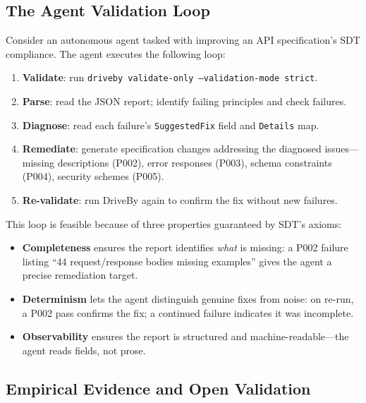 \subsection{The Agent Validation Loop}
\label{subsec:agent-loop}

Consider an autonomous agent tasked with improving an API specification's SDT compliance. The agent executes the following loop:

\begin{enumerate}
    \item \textbf{Validate}: run \texttt{driveby validate-only --validation-mode strict}.
    \item \textbf{Parse}: read the JSON report; identify failing principles and check failures.
    \item \textbf{Diagnose}: read each failure's \texttt{SuggestedFix} field and \texttt{Details} map.
    \item \textbf{Remediate}: generate specification changes addressing the diagnosed issues---missing descriptions (P002), error responses (P003), schema constraints (P004), security schemes (P005).
    \item \textbf{Re-validate}: run DriveBy again to confirm the fix without new failures.
\end{enumerate}

This loop is feasible because of three properties guaranteed by SDT's axioms:

\begin{itemize}
    \item \textbf{Completeness} ensures the report identifies \textit{what} is missing: a P002 failure listing ``44 request/response bodies missing examples'' gives the agent a precise remediation target.
    \item \textbf{Determinism} lets the agent distinguish genuine fixes from noise: on re-run, a P002 pass confirms the fix; a continued failure indicates it was incomplete.
    \item \textbf{Observability} ensures the report is structured and machine-readable---the agent reads fields, not prose.
\end{itemize}

\subsection{Empirical Evidence and Open Validation}
\label{sec:agent-feedback-future}

